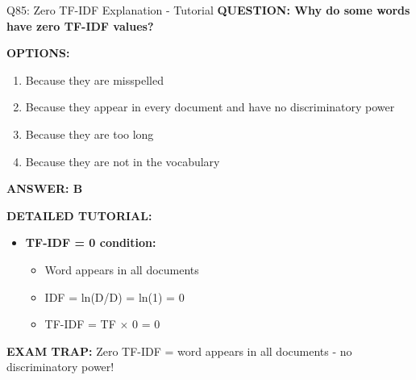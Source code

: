 \documentclass[8pt]{beamer}
\begin{document}
	\begin{frame}{Q85: Zero TF-IDF Explanation - Tutorial}
		\fontsize{6.5}{7.5}\selectfont
		\textbf{QUESTION: Why do some words have zero TF-IDF values?}
		
		\vspace{0.1cm}
		\textbf{OPTIONS:}
		\begin{enumerate}
			\item Because they are misspelled
			\item Because they appear in every document and have no discriminatory power
			\item Because they are too long
			\item Because they are not in the vocabulary
		\end{enumerate}
		
		\vspace{0.1cm}
		\textcolor{myblue}{\textbf{ANSWER: B}}
		
		\vspace{0.1cm}
		\textbf{DETAILED TUTORIAL:}
		\begin{itemize}
			\item \textbf{TF-IDF = 0 condition:}
			\begin{itemize}
				\item Word appears in all documents
				\item IDF = ln(D/D) = ln(1) = 0
				\item TF-IDF = TF $\times$ 0 = 0
			\end{itemize}
		\end{itemize}
		
		\textcolor{myred}{\textbf{EXAM TRAP:}} Zero TF-IDF = \textcolor{myblue}{word appears in all documents} - no discriminatory power!
	\end{frame}
	
\end{document}
